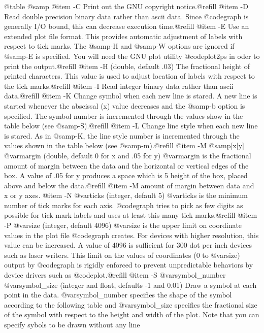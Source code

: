 @table @samp
@item -C
Print out the GNU copyright notice.@refill
@item -D
Read double precision binary data rather than ascii data.
Since @code{graph} is generally I/O bound, this can decrease execution
time.@refill
@item -E
Use an extended plot file format. This provides automatic adjustment of
labels with respect to tick marks.  The @samp{-H} and @samp{-W} options
are ignored if @samp{-E} is specified.  You will need the GNU plot
utility @code{plot2ps} in oder to print the output.@refill
@item -H
(double, default .03) The fractional height of printed characters.  This
value is used to adjust location of labels with respect to the tick
marks.@refill
@item -I
Read integer binary data rather than ascii data.@refill
@item -K
Change symbol when each new line is stared.  A new line is started
whenever the abscissal (x) value decreases and the @samp{-b} option is
specified.  The symbol number is incremented through the values show in
the table below (see @samp{-S}).@refill
@item -L
Change line style when each new line is stared. As in @samp{-K}, the
line style number is incremented through the values shown in the table
below (see @samp{-m}).@refill
@item -M @samp{[x|y]} @var{margin}
(double, default 0 for x and .05 for y) @var{margin} is the fractional
amount of margin between the data and the horizontal or vertical edges
of the box. A value of .05 for y produces a space which is 5%
height of the box, placed above and below the data.@refill
@item -M  
amount of margin between data and x or y axes.
@item -N @var{ticks}
(integer, default 5) @var{ticks} is the minimum number of tick marks for
each axis.  @code{graph} tries to pick as few digits as possible for
tick mark labels and uses at least this many tick marks.@refill
@item -P @var{size}
(integer, default 4096) @var{size} is the upper limit on coordinate
values in the plot file @code{graph} creates.  For devices with higher
resolution, this value can be increased.  A value of 4096 is sufficient
for 300 dot per inch devices such as laser writers.  This limit on the
values of coordinates (0 to @var{size}) output by @code{graph} is
rigidly enforced to prevent unpredictable behaviors by device drivers
such as @code{plot}.@refill
@item -S @var{symbol_number} @var{symbol_size}
(integer and float, defaults -1 and 0.01) Draw a symbol at each point in
the data. @var{symbol_number} specifies the shape of the symbol
according to the following table and @var{symbol_size} specifies the
fractional size of the symbol with respect to the height and width of
the plot.  Note that you can specify sybols to be drawn without any line
